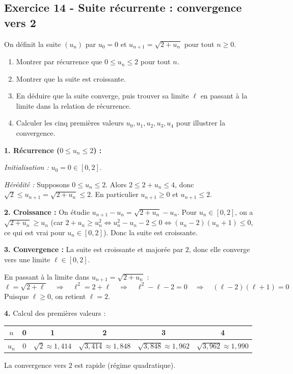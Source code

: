 \documentclass[12pt,a4paper]{article}
\begin{document}
\subsection*{Exercice 14 - Suite récurrente : convergence vers 2 \niveau{\moyen}}

\begin{boiteexercice}
On définit la suite $(u_n)$ par $u_0 = 0$ et $u_{n+1} = \sqrt{2+u_n}$ pour tout $n \geq 0$.
\begin{enumerate}
  \item Montrer par récurrence que $0 \leq u_n \leq 2$ pour tout $n$.
  \item Montrer que la suite est croissante.
  \item En déduire que la suite converge, puis trouver sa limite $\ell$ en passant à la limite dans la relation de récurrence.
  \item Calculer les cinq premières valeurs $u_0, u_1, u_2, u_3, u_4$ pour illustrer la convergence.
\end{enumerate}
\end{boiteexercice}

\begin{boitecorrige}
\textbf{1. Récurrence ($0 \leq u_n \leq 2$) :}

\textit{Initialisation :} $u_0 = 0 \in [0,2]$.

\textit{Hérédité :} Supposons $0 \leq u_n \leq 2$. Alors $2 \leq 2+u_n \leq 4$, donc $\sqrt{2} \leq u_{n+1} = \sqrt{2+u_n} \leq 2$. En particulier $u_{n+1} \geq 0$ et $u_{n+1} \leq 2$.

\textbf{2. Croissance :} On étudie $u_{n+1} - u_n = \sqrt{2+u_n} - u_n$. Pour $u_n \in [0,2]$, on a $\sqrt{2+u_n} \geq u_n$ (car $2+u_n \geq u_n^2 \Leftrightarrow u_n^2 - u_n - 2 \leq 0 \Leftrightarrow (u_n-2)(u_n+1) \leq 0$, ce qui est vrai pour $u_n \in [0,2]$). Donc la suite est croissante.

\textbf{3. Convergence :} La suite est croissante et majorée par $2$, donc elle converge vers une limite $\ell \in [0,2]$.

En passant à la limite dans $u_{n+1} = \sqrt{2+u_n}$ :
\[
\ell = \sqrt{2+\ell} \quad \Rightarrow \quad \ell^2 = 2+\ell \quad \Rightarrow \quad \ell^2 - \ell - 2 = 0 \quad \Rightarrow \quad (\ell-2)(\ell+1) = 0
\]
Puisque $\ell \geq 0$, on retient $\boxed{\ell = 2}$.

\textbf{4.} Calcul des premières valeurs :
\begin{center}
\begin{tabular}{c|ccccc}
$n$ & 0 & 1 & 2 & 3 & 4 \\
\hline
$u_n$ & $0$ & $\sqrt{2}\approx 1{,}414$ & $\sqrt{3{,}414}\approx 1{,}848$ & $\sqrt{3{,}848}\approx 1{,}962$ & $\sqrt{3{,}962}\approx 1{,}990$
\end{tabular}
\end{center}
La convergence vers $2$ est rapide (régime quadratique).
\end{boitecorrige}
\end{document}
